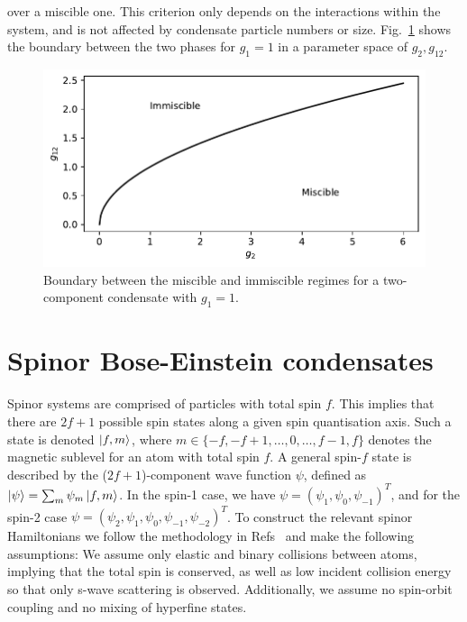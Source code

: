 over a miscible one.
This criterion only depends on the interactions within the system, and is not
affected by condensate particle numbers or size.
Fig.~\ref{fig: miscible-vs-immiscible} shows the boundary between the two
phases for \(g_1=1\) in a parameter space of \(g_2, g_{12}\).
\begin{figure}
    \centering
    \includegraphics{gfx/ch-theory/miscible_vs_immiscible.pdf}
    \caption[Two-component miscible vs immiscible boundary]
    {\label{fig: miscible-vs-immiscible}Boundary between the miscible
        and immiscible regimes for a two-component condensate with \(g_1=1\).}
\end{figure}


\section{Spinor Bose-Einstein condensates}
Spinor systems are comprised of particles with total spin \(f\).
This implies that there are \(2f + 1\) possible spin states along a given spin
quantisation axis.
Such a state is denoted \(\ket{f, m} \), where
\(m \in \{-f, -f+1, \ldots, 0, \ldots, f - 1, f\} \) denotes the magnetic
sublevel for an atom with total spin \( f\).
A general spin-\(f\) state is described by the (\(2f+1\))-component wave
function \(\psi \), defined as \(\ket{\psi} = \sum_m\psi_m\ket{f, m}\).
In the spin-1 case, we have \(\psi = {(\psi_1, \psi_0, \psi_{-1})}^T\), and for
the spin-2 case \(\psi = {(\psi_2, \psi_1, \psi_0, \psi_{-1}, \psi_{-2})}^T\).
To construct the relevant spinor Hamiltonians we follow the methodology in
Refs~\cite{Ho1998,Ohmi1998,Kawaguchi2012,Stamper-Kurn2013} and make the
following assumptions: We assume only elastic and binary collisions between
atoms, implying that the total spin is conserved, as well as low incident
collision energy so that only s-wave scattering is observed.
Additionally, we assume no spin-orbit coupling and no mixing of
hyperfine states.

